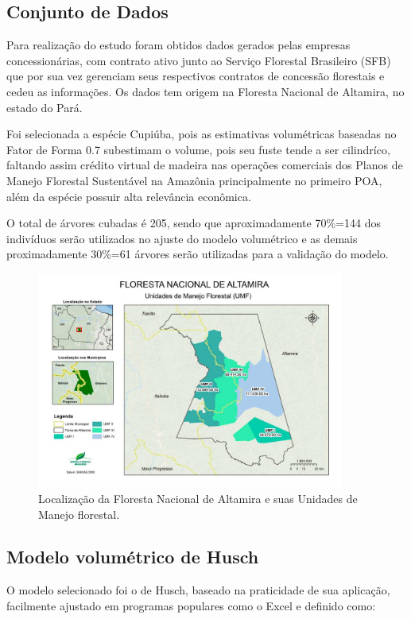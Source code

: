 \documentclass[a4paper,12pt]{article}
\begin{document}
\subsection{Conjunto de Dados}
Para realização do estudo foram obtidos  dados gerados pelas empresas concessionárias, com contrato ativo junto ao Serviço Florestal Brasileiro (SFB) que por sua vez gerenciam seus respectivos contratos de concessão florestais e cedeu as informações. Os dados tem origem na Floresta Nacional de Altamira, no estado do Pará.

Foi selecionada a espécie Cupiúba, pois as estimativas volumétricas baseadas no Fator de Forma 0.7 subestimam o volume, pois seu fuste tende a ser cilindríco, faltando assim crédito virtual de madeira nas operações comerciais dos Planos de Manejo Florestal Sustentável na Amazônia principalmente no primeiro POA, além da espécie possuir alta relevância econômica.

O total de árvores cubadas é 205, sendo que aproximadamente 70\%=144 dos indivíduos serão utilizados no ajuste do modelo volumétrico e as demais proximadamente 30\%=61 árvores serão utilizadas para a validação do modelo.

\begin{figure}[H]
\centering
\includegraphics[width=0.9\textwidth]{flora.jpg}
\caption{Localização da Floresta Nacional de Altamira e suas Unidades de Manejo florestal.}
\label{mapa}
\end{figure}

\subsection{Modelo volumétrico de Husch}

O modelo selecionado foi o de Husch, baseado na praticidade de sua aplicação, facilmente ajustado em programas populares como o Excel e definido como:
\end{document}
